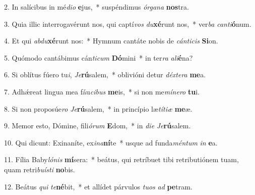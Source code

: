 2. In salícibus in mé\textit{di}\textit{o} \textbf{e}jus,~*  suspéndimus \textit{ór}\textit{ga}\textit{na} \textbf{nos}tra.\

3. Quia illic interrogavérunt nos, qui captí\textit{vos} \textit{du}\textbf{xé}runt nos,~*  ver\textit{ba} \textit{can}\textit{ti}\textbf{ó}num.\

4. Et qui \textit{ab}\textit{du}\textbf{xé}runt nos:~*  Hymnum cantáte nobis de \textit{cán}\textit{ti}\textit{cis} \textbf{Si}on.\

5. Quómodo cantábimus cán\textit{ti}\textit{cum} \textbf{Dó}mini~*  in ter\textit{ra} \textit{a}\textit{li}\textbf{é}na?\

6. Si oblítus fúero tu\textit{i}, \textit{Je}\textbf{rú}salem,~*  oblivióni detur \textit{déx}\textit{te}\textit{ra} \textbf{me}a.\

7. Adhǽreat lingua mea fáu\textit{ci}\textit{bus} \textbf{me}is,~*  si non me\textit{mí}\textit{ne}\textit{ro} \textbf{tu}i.\

8. Si non proposúe\textit{ro} \textit{Je}\textbf{rú}salem,~*  in princípio læ\textit{tí}\textit{ti}\textit{æ} \textbf{me}æ.\

9. Memor esto, Dómine, fili\textit{ó}\textit{rum} \textbf{E}dom,~*  in \textit{di}\textit{e} \textit{Je}\textbf{rú}salem.\

10. Qui dicunt: Exinaníte, ex\textit{i}\textit{na}\textbf{ní}te~*  usque ad funda\textit{mén}\textit{tum} \textit{in} \textbf{e}a.\

11. Fília Baby\textit{ló}\textit{nis} \textbf{mí}sera:~*  beátus, qui retríbuet tibi retributiónem tuam, quam retri\textit{bu}\textit{ís}\textit{ti} \textbf{no}bis.\

12. Beátus \textit{qui} \textit{te}\textbf{né}bit,~*  et allídet párvulos \textit{tu}\textit{os} \textit{ad} \textbf{pe}tram.\


